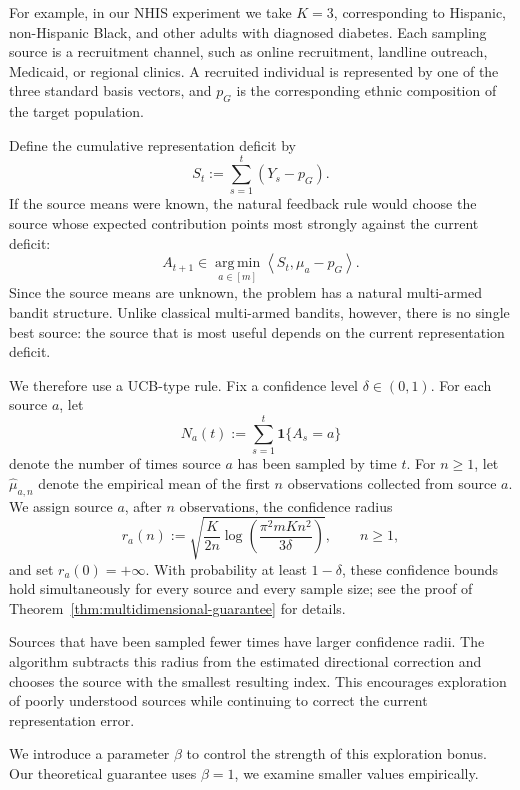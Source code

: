 \documentclass[twoside]{article}
\begin{document}
For example, in our NHIS experiment we take \(K=3\), corresponding to
Hispanic, non-Hispanic Black, and other adults with diagnosed diabetes.
Each sampling source is a recruitment channel, such as online recruitment,
landline outreach, Medicaid, or regional clinics. A recruited individual is
represented by one of the three standard basis vectors, and \(p_G\) is the
corresponding ethnic composition of the target population.

Define the cumulative representation deficit by
\[
S_t:=\sum_{s=1}^t(Y_s-p_G).
\]
If the source means were known, the natural feedback rule would choose the source
whose expected contribution points most strongly against the current deficit:
\[
A_{t+1}
\in
\operatorname*{arg\,min}_{a\in[m]}
\left\langle S_t,\mu_a-p_G\right\rangle.
\]
Since the source means are unknown, the problem has a natural
multi-armed bandit structure. Unlike classical multi-armed bandits,
however, there is no single best source: the source that is most
useful depends on the current representation deficit.

We therefore use a UCB-type rule. Fix a confidence level
\(\delta\in(0,1)\). For each source \(a\), let
\[
N_a(t):=\sum_{s=1}^t \mathbf 1\{A_s=a\}
\]
denote the number of times source \(a\) has been sampled by time \(t\).
For \(n\ge1\), let \(\widehat\mu_{a,n}\) denote the empirical mean of the
first \(n\) observations collected from source \(a\). 
We assign source \(a\), after \(n\) observations, the confidence radius
\[
r_a(n)
:=
\sqrt{
\frac{K}{2n}
\log\left(
\frac{\pi^2 m K n^2}{3\delta}
\right)
},
\qquad n\ge1,
\]
and set \(r_a(0)=+\infty\). 
With probability at least \(1-\delta\), these confidence bounds hold
simultaneously for every source and every sample size; see the proof of
Theorem~\ref{thm:multidimensional-guarantee} for details.

Sources that have been sampled fewer times have larger confidence radii.
The algorithm subtracts this radius from the estimated directional
correction and chooses the source with the smallest resulting index. This
encourages exploration of poorly understood sources while continuing to
correct the current representation error.

We introduce a parameter \(\beta\) to control the strength of this
exploration bonus. Our theoretical guarantee uses \(\beta=1\), we examine smaller values empirically.
\end{document}

